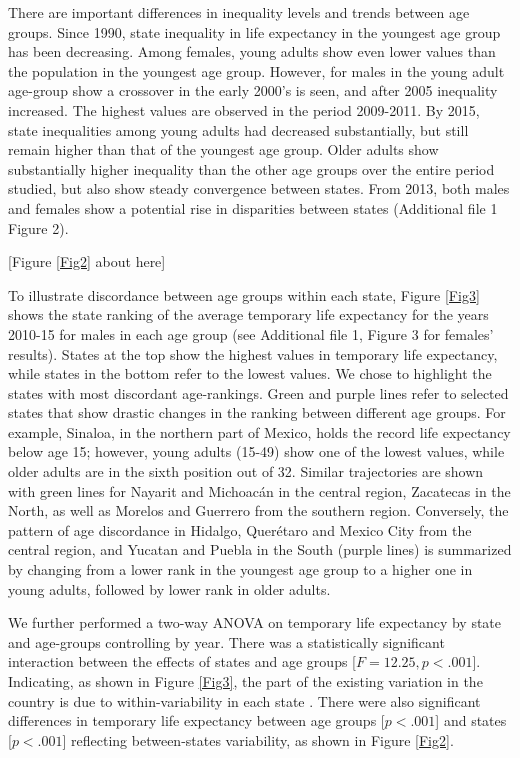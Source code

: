 \documentclass{bmcart}
\begin{document}
There are important differences in inequality levels and trends between age groups. Since 1990, state inequality in life expectancy in the youngest age group has been decreasing. Among females, young adults show even lower values than the population in the youngest age group. However, for males in the young adult age-group show a crossover in the early 2000's is seen, and after 2005 inequality increased. The highest values are observed in the period 2009-2011. By 2015, state inequalities among young adults had decreased substantially, but still remain higher than that of the youngest age group. Older adults show substantially higher inequality than the other age groups over the entire period studied, but also show steady convergence between states. From 2013, both males and females show a potential rise in disparities between states (Additional file 1 Figure 2).  \\

\begin{center}
[Figure \ref{Fig2} about here]
\end{center}


To illustrate discordance between age groups within each state, Figure \ref{Fig3} shows the state ranking of the average temporary life expectancy for the years 2010-15 for males in each age group (see Additional file 1, Figure 3 for females' results). States at the top show the highest values in temporary life expectancy, while states in the bottom refer to the lowest values. We chose to highlight the states with most discordant age-rankings. Green and purple lines refer to selected states that show drastic changes in the ranking between different age groups. For example, Sinaloa, in the northern part of Mexico, holds the record life expectancy below age 15; however, young adults (15-49) show one of the lowest values, while older adults are in the sixth position out of 32. Similar trajectories are shown with green lines for Nayarit and Michoac\'an in the central region, Zacatecas in the North, as well as Morelos and Guerrero from the southern region. Conversely, the pattern of age discordance in Hidalgo, Quer\'etaro and Mexico City from the central region, and Yucatan and Puebla in the South (purple lines) is summarized by changing from a lower rank in the youngest age group to a higher one in young adults, followed by lower rank in older adults. 

We further performed a two-way ANOVA on temporary life expectancy by state and age-groups controlling by year. There was a statistically significant interaction between the effects of states and age groups [$F=12.25, p < .001$]. Indicating, as shown in Figure \ref{Fig3}, the part of the existing variation in the country is due to within-variability in each state . There were also significant differences in temporary life expectancy between age groups [$p < .001$] and states [$p < .001$] reflecting between-states variability, as shown in Figure \ref{Fig2}.\\
\end{document}
